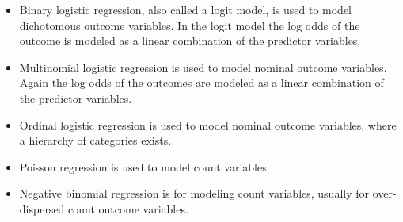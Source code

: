 \documentclass[00-GLMregslides.tex]{subfiles}
\begin{document}
\begin{frame}
\Large
\begin{itemize}
\item Binary logistic regression, also called a logit model, is used to model dichotomous outcome variables. In the logit model the log odds of the outcome is modeled as a linear combination of the predictor variables.
\item Multinomial logistic regression is used to model nominal outcome variables. Again the log odds of the outcomes are modeled as a linear combination of the predictor variables.
\item Ordinal logistic regression is used to model nominal outcome variables, where a hierarchy of categories exists.
\end{itemize}
\end{frame}
\begin{frame}
\Large
\begin{itemize}
\item  Poisson regression is used to model count variables.
\item  Negative binomial regression is for modeling count variables, usually for over-dispersed count outcome variables.
\end{itemize}
\end{frame}
\end{document}
